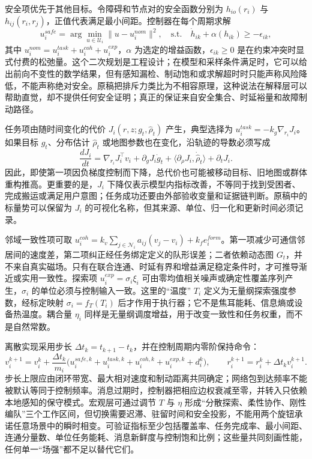安全项优先于其他目标。令障碍和节点对的安全函数分别为 $h_{io}(r_i)$ 与 $h_{ij}(r_i,r_j)$，正值代表满足最小间距。控制器在每个周期求解
\[
 u_i^{safe}=\arg\min_{u\in\mathcal U_i}\|u-u_i^{nom}\|^2,
 \quad\text{s.t.}\quad \dot h_{ik}+\alpha(h_{ik})\ge-\epsilon_{ik},
\]
其中 $u_i^{nom}=u_i^{task}+u_i^{coh}+u_i^{exp}$，$\alpha$ 为选定的增益函数，$\epsilon_{ik}\ge0$ 是在约束冲突时显式付费的松弛量。这个二次规划是工程设计；在模型和采样条件满足时，它可以给出前向不变性的数学结果，但有感知漏检、制动饱和或求解超时时只能声称风险降低，不能声称绝对安全。原稿把排斥力类比为不相容原理，这种说法在解释层可以帮助直觉，却不提供任何安全证明；真正的保证来自安全集合、时延裕量和故障制动路径。

任务项由随时间变化的代价 $J_i(r,z;g_t,\hat\rho_t)$ 产生，典型选择为 $u_i^{task}=-k_g\nabla_{r_i}J_i$。如果目标 $g_t$、分布估计 $\hat\rho_t$ 或地图参数也在变化，沿轨迹的导数必须写成
\[
 \frac{dJ_i}{dt}=\nabla_{r_i}J_i^\top v_i+
 \partial_gJ_i\dot g_t+
 \langle\partial_{\rho}J_i,\dot{\hat\rho}_t\rangle+
 \partial_tJ_i.
\]
因此，即使第一项因负梯度控制而下降，总代价也可能被移动目标、旧地图或群体重构推高。更重要的是，$J_i$ 下降仅表示模型内指标改善，不等同于找到受困者、完成搬运或满足用户意图；任务成功还要由外部验收变量和证据链判断。原稿中的标量势可以保留为 $J_i$ 的可视化名称，但其来源、单位、归一化和更新时间必须记录。

邻域一致性项可取 $u_i^{coh}=k_v\sum_{j\in\mathcal N_i}a_{ij}(v_j-v_i)+k_f e_i^{form}$。第一项减少可通信邻居间的速度差，第二项纠正经任务绑定定义的队形误差；二者依赖动态图 $G_t$，并不来自真实磁场。只有在联合连通、时延有界和增益满足稳定条件时，才可推导渐近或实用一致性。探索项 $u_i^{exp}=\sigma_i\xi_i$ 可由零均值相关噪声或确定性覆盖序列产生，$\sigma_i$ 的单位必须与控制输入一致。这里的“温度” $T_i$ 定义为无量纲探索强度参数，经标定映射 $\sigma_i=f_T(T_i)$ 后才作用于执行器；它不是焦耳能耗、信息熵或设备热温度。耦合量 $\eta_i$ 同样是无量纲调度增益，用于改变一致性和任务权重，而不是自然常数。

离散实现采用步长 $\Delta t_k=t_{k+1}-t_k$，并在控制周期内零阶保持命令：
\[
 v_i^{k+1}=v_i^k+\frac{\Delta t_k}{m_i}
 \bigl(u_i^{safe,k}+u_i^{task,k}+u_i^{coh,k}+u_i^{exp,k}+d_i^k\bigr),
 \qquad r_i^{k+1}=r_i^k+\Delta t_k v_i^{k+1}.
\]
步长上限应由闭环带宽、最大相对速度和制动距离共同确定；网络包到达频率不能被默认等同于控制频率。消息过期时，控制器把相应边权衰减至零，并转入只依赖本地感知的保守模式。宏观层可通过调节 $T$ 与 $\eta$ 形成“分散探索、柔性协作、刚性编队”三个工作区间，但切换需要迟滞、驻留时间和安全投影，不能用两个旋钮承诺任意场景中的瞬时相变。可验证指标至少包括覆盖率、任务完成率、最小间距、连通分量数、单位任务能耗、消息新鲜度与控制饱和比例；这些量共同刻画性能，任何单一“场强”都不足以替代它们。

